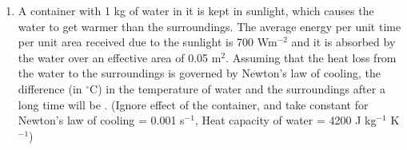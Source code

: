 
\begin{enumerate}
    \item A container with 1 kg of water in it is kept in sunlight, which causes the water to get warmer than the surroundings. The average energy per unit time per unit area received due to the sunlight is 700 Wm$^{-2}$ and it is absorbed by the water over an effective area of 0.05 m$^2$. Assuming that the heat loss from the water to the surroundings is governed by Newton’s law of cooling, the difference (in $^\circ$C) in the temperature of water and the surroundings after a long time will be \underline{\hspace{3cm}}. (Ignore effect of the container, and take constant for Newton’s law of cooling = 0.001 s$^{-1}$, Heat capacity of water = 4200 J kg$^{-1}$ K$^{-1}$)
\end{enumerate}
